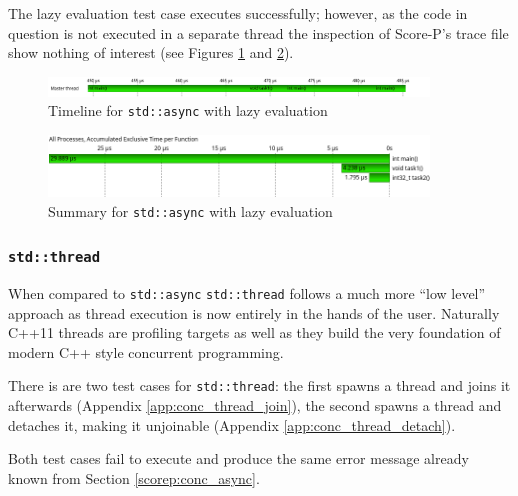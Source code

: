 The lazy evaluation test case executes successfully; however, as the code in question is not executed in a separate thread the inspection of Score-P's trace file show nothing of interest (see Figures \ref{scorep:conc_async_lazy_timeline} and \ref{scorep:conc_async_lazy_summary}).

\begin{figure}[htbp]
	\begin{center}
		\includegraphics[width=0.9\textwidth]{img/scorep_async_lazy_timeline.png}
		\caption{Timeline for \texttt{std::async} with lazy evaluation}
		\label{scorep:conc_async_lazy_timeline}
	\end{center}
\end{figure}

\begin{figure}[htbp]
	\begin{center}
		\includegraphics[width=0.9\textwidth]{img/scorep_async_lazy_summary.png}
		\caption{Summary for \texttt{std::async} with lazy evaluation}
		\label{scorep:conc_async_lazy_summary}
	\end{center}
\end{figure}

\subsubsection{\texttt{std::thread}}\label{scorep:conc_thread}

When compared to \texttt{std::async} \texttt{std::thread} follows a much more ``low level'' approach as thread execution is now entirely in the hands of the user. Naturally C++11 threads are profiling targets as well as they build the very foundation of modern C++ style concurrent programming.

There is are two test cases for \texttt{std::thread}: the first spawns a thread and joins it afterwards (Appendix \ref{app:conc_thread_join}), the second spawns a thread and detaches it, making it unjoinable (Appendix \ref{app:conc_thread_detach}).

Both test cases fail to execute and produce the same error message already known from Section \ref{scorep:conc_async}.

